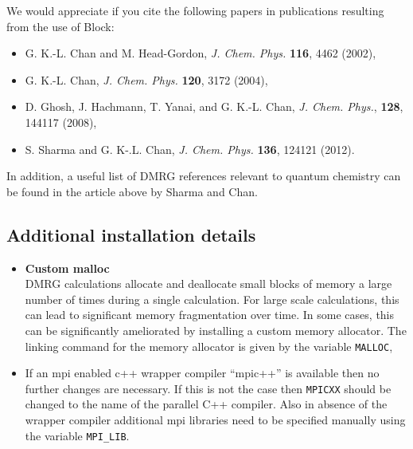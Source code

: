 \documentclass[letterpaper,12pt,aps, pra]{revtex4-1}
\begin{document}
We would appreciate if you cite the following papers in publications resulting from the use of Block:
\begin{itemize}
 \item G. K.-L. Chan and M. Head-Gordon, \emph{J. Chem. Phys.} \textbf{116}, 4462 (2002),
 \item G. K.-L. Chan, \emph{J. Chem. Phys.} \textbf{120}, 3172 (2004),
 \item D. Ghosh, J. Hachmann, T. Yanai, and G. K.-L. Chan, \emph{J. Chem. Phys.}, {\bf 128}, 144117 (2008),
 \item S. Sharma and G. K-.L. Chan, \emph{J. Chem. Phys.} \textbf{136}, 124121 (2012).
\end{itemize}

In addition, a useful list of DMRG references relevant to quantum chemistry
can be found in the article above by Sharma and Chan.

\subsection{Additional installation details}\label{sec:appInstall}
\begin{itemize}
	\item \textbf{Custom malloc}\\
DMRG calculations allocate and deallocate small blocks of memory a large number of times during a single calculation. For large scale calculations,
this can lead to significant memory fragmentation over time. In some cases, this can be significantly ameliorated by installing a
custom memory allocator. The linking command for the memory allocator is given by the variable \texttt{MALLOC},
	\item 
If an mpi enabled c++ wrapper compiler ``mpic++'' is available then no further changes are necessary. If this is not the case then \texttt{MPICXX} should be changed to the name of the parallel C++ compiler.  Also in absence of the wrapper compiler additional mpi libraries need to be specified manually using the variable \texttt{MPI\_LIB}. %
\end{itemize}
\end{document}

